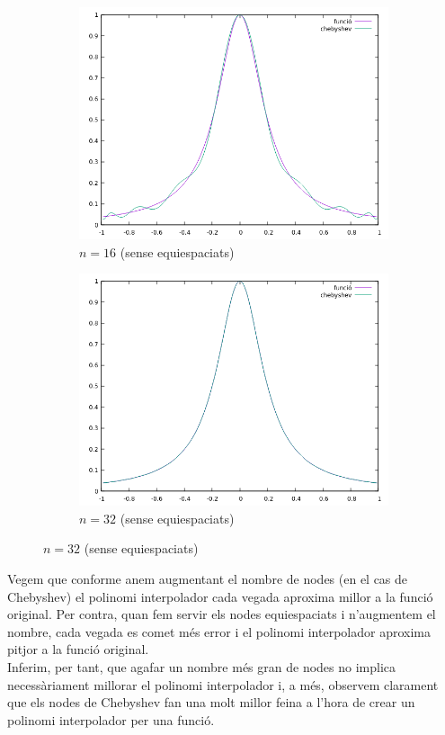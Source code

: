 \documentclass[a4paper,11pt]{article}
\begin{document}
  \begin{figure}[H]
  \begin{subfigure}{0.49\textwidth}
    \includegraphics[width = 0.9 \linewidth]{imatges/plot16-noeq.png}
  \centering
  \caption*{$n = 16$ (sense equiespaciats)}
  \end{subfigure}
  \begin{subfigure}{0.49\textwidth}
    \includegraphics[width = 0.9 \linewidth]{imatges/plot32-noeq.png}
  \centering
  \caption*{$n = 32$ (sense equiespaciats)}
  \end{subfigure}
  \end{figure}
  Vegem que conforme anem augmentant el nombre de nodes (en el cas de Chebyshev) el polinomi interpolador cada vegada aproxima millor a la funció original. Per contra, quan fem servir els nodes equiespaciats i n'augmentem el nombre, cada vegada es comet més error i el polinomi interpolador aproxima pitjor a la funció original.\\
  Inferim, per tant, que agafar un nombre més gran de nodes no implica necessàriament millorar el polinomi interpolador i, a més, observem clarament que els nodes de Chebyshev fan una molt millor feina a l'hora de crear un polinomi interpolador per una funció.
\end{document}
